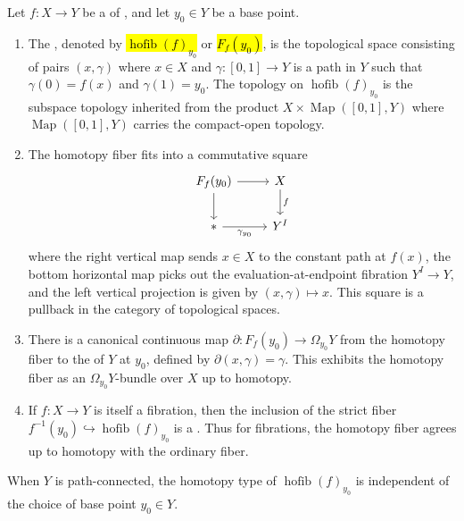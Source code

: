 \begin{definition} \label{definition:homotopy_fiber_of_a_map_of_topological_spaces}

Let $f: X \to Y$ be a  of , and let $y_0 \in Y$ be a base point.

\begin{enumerate}
    \item The , denoted by \hl{$\operatorname{hofib}(f)_{y_0}$} or \hl{$F_f(y_0)$}, is the topological space consisting of pairs $(x, \gamma)$ where $x \in X$ and $\gamma: [0,1] \to Y$ is a path in $Y$ such that $\gamma(0) = f(x)$ and $\gamma(1) = y_0$. The topology on $\operatorname{hofib}(f)_{y_0}$ is the subspace topology inherited from the product $X \times \operatorname{Map}([0,1], Y)$ where $\operatorname{Map}([0,1], Y)$ carries the compact-open topology.

    \item The homotopy fiber fits into a commutative square
    $$
    \begin{tikzcd}
    F_f(y_0) \arrow[r] \arrow[d] & X \arrow[d, "f"] \\
    * \arrow[r, "\gamma_{y_0}"'] & Y^I
    \end{tikzcd}
    $$
    where the right vertical map sends $x \in X$ to the constant path at $f(x)$, the bottom horizontal map picks out the evaluation-at-endpoint fibration $Y^I \to Y$, and the left vertical projection is given by $(x, \gamma) \mapsto x$. This square is a pullback in the category of topological spaces.

    \item There is a canonical continuous map $\partial: F_f(y_0) \to \Omega_{y_0}Y$ from the homotopy fiber to the  of $Y$ at $y_0$, defined by $\partial(x, \gamma) = \gamma$. This exhibits the homotopy fiber as an $\Omega_{y_0}Y$-bundle over $X$ up to homotopy.

    \item If $f: X \to Y$ is itself a fibration, then the inclusion of the strict fiber $f^{-1}(y_0) \hookrightarrow \operatorname{hofib}(f)_{y_0}$ is a . Thus for fibrations, the homotopy fiber agrees up to homotopy with the ordinary fiber.
\end{enumerate}

When $Y$ is path-connected, the homotopy type of $\operatorname{hofib}(f)_{y_0}$ is independent of the choice of base point $y_0 \in Y$.

\end{definition}
